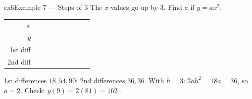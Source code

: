 \documentclass[11pt]{article}
\begin{document}
\begin{example}{ex6}{Example 7 --- Steps of 3}
The $x$-values go up by $3$. Find $a$ if $y=ax^2$.
\begin{center}\renewcommand{\arraystretch}{1.15}\setlength{\tabcolsep}{2pt}\begin{tabular}{r|>{\centering\arraybackslash}p{0.62cm}>{\centering\arraybackslash}p{0.62cm}>{\centering\arraybackslash}p{0.62cm}>{\centering\arraybackslash}p{0.62cm}>{\centering\arraybackslash}p{0.62cm}>{\centering\arraybackslash}p{0.62cm}>{\centering\arraybackslash}p{0.62cm}>{\centering\arraybackslash}p{0.62cm}}
$x$ & \multicolumn{2}{c}{\colorbox{iagreen}{\makebox[1.12cm]{\strut \color{white}\bfseries $0$}}} & \multicolumn{2}{c}{\colorbox{iagreen}{\makebox[1.12cm]{\strut \color{white}\bfseries $3$}}} & \multicolumn{2}{c}{\colorbox{iagreen}{\makebox[1.12cm]{\strut \color{white}\bfseries $6$}}} & \multicolumn{2}{c}{\colorbox{iagreen}{\makebox[1.12cm]{\strut \color{white}\bfseries $9$}}} \\[2pt]
$y$ & \multicolumn{2}{c}{\colorbox{keybg}{\makebox[1.12cm]{\strut $0$}}} & \multicolumn{2}{c}{\colorbox{keybg}{\makebox[1.12cm]{\strut $18$}}} & \multicolumn{2}{c}{\colorbox{keybg}{\makebox[1.12cm]{\strut $72$}}} & \multicolumn{2}{c}{\colorbox{keybg}{\makebox[1.12cm]{\strut $162$}}} \\[2pt]
\textcolor{exblue}{\scriptsize 1st diff} & & \multicolumn{2}{c}{\colorbox{exbg}{\makebox[1.12cm]{\strut \textcolor{exblue}{$+18$}}}} & \multicolumn{2}{c}{\colorbox{exbg}{\makebox[1.12cm]{\strut \textcolor{exblue}{$+54$}}}} & \multicolumn{2}{c}{\colorbox{exbg}{\makebox[1.12cm]{\strut \textcolor{exblue}{$+90$}}}} & \\[2pt]
\textcolor{qorange}{\scriptsize 2nd diff} & & & \multicolumn{2}{c}{\colorbox{qbg}{\makebox[1.12cm]{\strut \textcolor{qorange!70!black}{$+36$}}}} & \multicolumn{2}{c}{\colorbox{qbg}{\makebox[1.12cm]{\strut \textcolor{qorange!70!black}{$+36$}}}} & & \\
\end{tabular}\end{center}
\soln 1st differences $18,54,90$; 2nd differences $36,36$. With $h=3$: $2ah^2=18a=36$, so $a=2$. Check: $y(9)=2(81)=162$ \checkmark.
\end{example}
\end{document}
